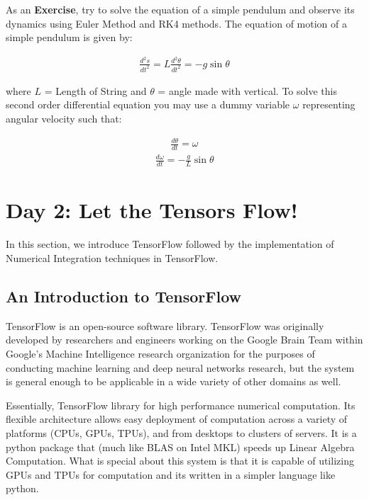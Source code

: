 \documentclass[10pt,letterpaper]{article}
\begin{document}
As an \textbf{Exercise}, try to solve the equation of a simple pendulum and observe its dynamics using Euler Method and RK4 methods. The equation of motion of a simple pendulum is given by: 

\begin{eqnarray}\frac{d^2s}{dt^2}=L\frac{d^2\theta}{dt^2}=-g\sin{\theta}\end{eqnarray}

where $L$ = Length of String and $\theta$ = angle made with vertical. To solve this second order differential equation you may use a dummy variable $\omega$ representing angular velocity such that:

\begin{eqnarray}\frac{d\theta}{dt}=\omega \end{eqnarray}
\begin{eqnarray}\frac{d\omega}{dt}=-\frac{g}{L}\sin{\theta} \end{eqnarray}

\section*{Day 2: Let the Tensors Flow!}

In this section, we introduce TensorFlow followed by the implementation of Numerical Integration techniques in TensorFlow.

\subsection*{An Introduction to TensorFlow}

TensorFlow is an open-source software library. TensorFlow was originally developed by researchers and engineers working on the Google Brain Team within Google’s Machine Intelligence research organization for the purposes of conducting machine learning and deep neural networks research, but the system is general enough to be applicable in a wide variety of other domains as well.~\cite{}

Essentially, TensorFlow library for high performance numerical computation. Its flexible architecture allows easy deployment of computation across a variety of platforms (CPUs, GPUs, TPUs), and from desktops to clusters of servers. It is a python package that (much like BLAS on Intel MKL) speeds up Linear Algebra Computation. What is special about this system is that it is capable of utilizing GPUs and TPUs for computation and its written in a simpler language like python.
\end{document}
